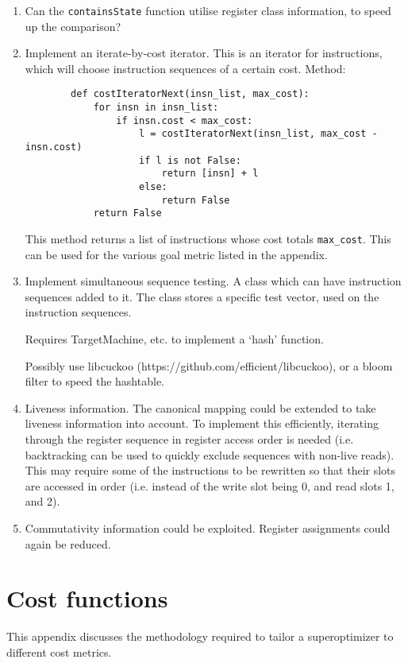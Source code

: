 \documentclass{article}
\begin{document}
\begin{enumerate}
    \item Can the \texttt{containsState} function utilise register class information, to speed up the comparison?
    \item Implement an iterate-by-cost iterator. This is an iterator for instructions, which will choose instruction sequences of a certain cost. Method:
        \begin{verbatim}
        def costIteratorNext(insn_list, max_cost):
            for insn in insn_list:
                if insn.cost < max_cost:
                    l = costIteratorNext(insn_list, max_cost - insn.cost)
                    if l is not False:
                        return [insn] + l
                    else:
                        return False
            return False
        \end{verbatim}

    This method returns a list of instructions whose cost totals \texttt{max\_cost}. This can be used for the various goal metric listed in the appendix.

    \item Implement simultaneous sequence testing. A class which can have instruction sequences added to it. The class stores a specific test vector, used on the instruction sequences.

    Requires TargetMachine, etc. to implement a `hash' function.

    Possibly use libcuckoo (https://github.com/efficient/libcuckoo), or a bloom filter to speed the hashtable.

    \item Liveness information. The canonical mapping could be extended to take liveness information into account. To implement this efficiently, iterating through the register sequence in register access order is needed (i.e. backtracking can be used to quickly exclude sequences with non-live reads). This may require some of the instructions to be rewritten so that their slots are accessed in order (i.e. instead of the write slot being 0, and read slots 1, and 2).
    \item Commutativity information could be exploited. Register assignments could again be reduced.
\end{enumerate}

\newpage
\appendix
\section{Cost functions}
This appendix discusses the methodology required to tailor a superoptimizer to different cost metrics.
\end{document}
